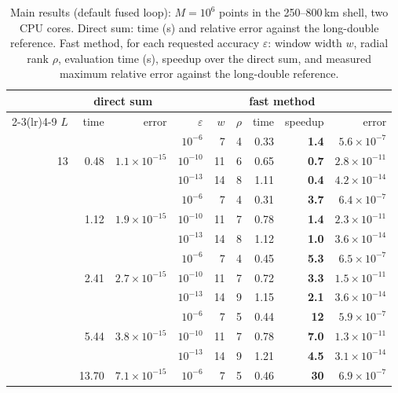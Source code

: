 \begin{table}[!htbp]\centering\small
\caption{Main results (default fused loop): $M=10^6$ points in the 250--800\,km shell, two CPU cores. Direct sum: time (s) and relative error
against the long-double reference. Fast method, for each requested accuracy $\varepsilon$: window width $w$, radial rank $\rho$, evaluation time (s),
speedup over the direct sum, and measured maximum relative error against the long-double reference.}\label{tab:results}
\begin{tabular}{rrr rrrrrr}\toprule
&\multicolumn{2}{c}{direct sum}&\multicolumn{6}{c}{fast method}\\
\cmidrule(lr){2-3}\cmidrule(lr){4-9}
$L$&time&error&$\varepsilon$&$w$&$\rho$&time&speedup&error\\\midrule
\multirow{3}{*}{13} & \multirow{3}{*}{0.48} & \multirow{3}{*}{$1.1\times10^{-15}$} & $10^{-6}$ & 7 & 4 & 0.33 & \textbf{1.4} & $5.6\times10^{-7}$\\
 & &  & $10^{-10}$ & 11 & 6 & 0.65 & \textbf{0.7} & $2.8\times10^{-11}$\\
 & &  & $10^{-13}$ & 14 & 8 & 1.11 & \textbf{0.4} & $4.2\times10^{-14}$\\\addlinespace[2pt]
\multirow{3}{*}{20} & \multirow{3}{*}{1.12} & \multirow{3}{*}{$1.9\times10^{-15}$} & $10^{-6}$ & 7 & 4 & 0.31 & \textbf{3.7} & $6.4\times10^{-7}$\\
 & &  & $10^{-10}$ & 11 & 7 & 0.78 & \textbf{1.4} & $2.3\times10^{-11}$\\
 & &  & $10^{-13}$ & 14 & 8 & 1.12 & \textbf{1.0} & $3.6\times10^{-14}$\\\addlinespace[2pt]
\multirow{3}{*}{30} & \multirow{3}{*}{2.41} & \multirow{3}{*}{$2.7\times10^{-15}$} & $10^{-6}$ & 7 & 4 & 0.45 & \textbf{5.3} & $6.5\times10^{-7}$\\
 & &  & $10^{-10}$ & 11 & 7 & 0.72 & \textbf{3.3} & $1.5\times10^{-11}$\\
 & &  & $10^{-13}$ & 14 & 9 & 1.15 & \textbf{2.1} & $3.6\times10^{-14}$\\\addlinespace[2pt]
\multirow{3}{*}{45} & \multirow{3}{*}{5.44} & \multirow{3}{*}{$3.8\times10^{-15}$} & $10^{-6}$ & 7 & 5 & 0.44 & \textbf{12} & $5.9\times10^{-7}$\\
 & &  & $10^{-10}$ & 11 & 7 & 0.78 & \textbf{7.0} & $1.3\times10^{-11}$\\
 & &  & $10^{-13}$ & 14 & 9 & 1.21 & \textbf{4.5} & $3.1\times10^{-14}$\\\addlinespace[2pt]
\multirow{3}{*}{70} & \multirow{3}{*}{13.70} & \multirow{3}{*}{$7.1\times10^{-15}$} & $10^{-6}$ & 7 & 5 & 0.46 & \textbf{30} & $6.9\times10^{-7}$\\

\end{tabular}
\end{table}
